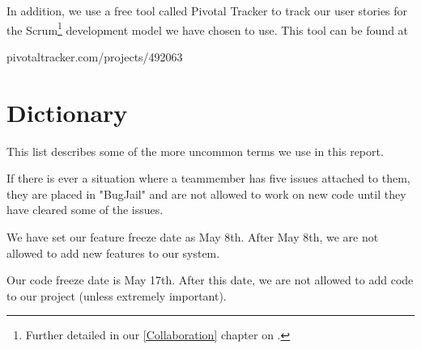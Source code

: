 In addition, we use a free tool called Pivotal Tracker to track our user stories for the Scrum\footnote{Further detailed in our \ref{Collaboration} chapter on \pageref{Collaboration}.} development model we have chosen to use. This tool can be found at \begin{my_itemize}\item pivotaltracker.com/projects/492063\end{my_itemize}
\section{Dictionary}
\label{Preface_Dictionary}
This list describes some of the more uncommon terms we use in this report.
\begin{my_description}
\item[BugJail] If there is ever a situation where a teammember has five issues attached to them, they are placed in "BugJail" and are not allowed to work on new code until they have cleared some of the issues.
\item[Feature Freeze] We have set our feature freeze date as May 8th. After May 8th, we are not allowed to add new features to our system.
\item[Code Freeze] Our code freeze date is May 17th. After this date, we are not allowed to add code to our project (unless extremely important).
\end{my_description}